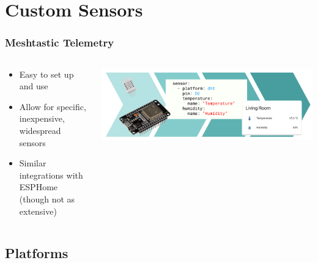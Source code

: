 \documentclass[aspectratio=169]{beamer}
\begin{document}
\section{Custom Sensors}
\frame{\sectionpage}
\begin{frame}[fragile]
  \frametitle{Meshtastic Telemetry}
  \begin{columns}[]
    \begin{column}[T]{0.45\paperwidth}
      \begin{itemize}%
        \item{Easy to set up and use}
        \item{Allow for specific, inexpensive, widespread sensors}
        \item{Similar integrations with ESPHome (though not as extensive)}
     \end{itemize}
    \end{column}
    \begin{column}[T]{0.45\paperwidth}
      \includegraphics[width=0.45\paperwidth,keepaspectratio]{images/esp.png}
    \end{column}
  \end{columns}
\end{frame}

\subsection{Platforms}
\end{document}

